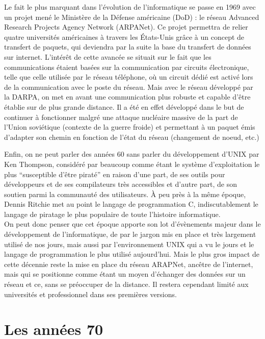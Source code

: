 \documentclass[a4paper]{memoir}
\begin{document}
Le fait le plus marquant dans l'évolution de l'informatique se passe en 1969 avec un projet mené le Ministère de la Défense américaine (DoD) : le réseau Advanced Research Projects Agency Network (ARPANet). Ce projet permettra de relier quatre universités américaines à travers les États-Unis grâce à un concept de transfert de paquets, qui deviendra par la suite la base du transfert de données sur internet. L'intérêt de cette avancée se situait sur le fait que les communications étaient basées sur la communication par circuits électronique, telle que celle utilisée par le réseau téléphone, où un circuit dédié est activé lors de la communication avec le poste du réseau. Mais avec le réseau développé par la DARPA, on met en avant une communication plus robuste et capable d'être établie sur de plus grande distance. Il a été en effet développé dans le but de continuer à fonctionner malgré une attaque nucléaire massive de la part de l'Union soviétique (contexte de la guerre froide) et permettant à un paquet émis d'adapter son chemin en fonction de l'état du réseau (changement de noeud, etc.)

Enfin, on ne peut parler des années 60 sans parler du développement d'UNIX par Ken Thompson, considéré par beaucoup comme étant le système d'exploitation le plus ``susceptible d'être piraté'' en raison d'une part, de ses outils pour développeurs et de ses compilateurs très accessibles et d'autre part, de son soutien parmi la communauté des utilisateurs. À peu près à la même époque, Dennis Ritchie met au point le langage de programmation C, indiscutablement le langage de piratage le plus populaire de toute l'histoire informatique.\\

On peut donc penser que cet époque apporte son lot d'évènements majeur dans le développement de l'informatique, de par le jargon mis en place et très largement utilisé de nos jours, mais aussi par l'environnement UNIX qui a vu le jours et le langage de programmation le plus utilisé aujourd'hui. Mais le plus gros impact de cette décennie reste la mise en place du réseau ARAPNet, ancêtre de l'internet, mais qui se positionne comme étant un moyen d'échanger des données sur un réseau et ce, sans se préoccuper de la distance. Il restera cependant limité aux universités et professionnel dans ses premières versions.

\section{Les années 70}
\end{document}
